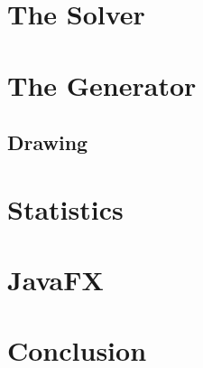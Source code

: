\documentclass[a4paper,10pt]{paper}
\begin{document}
\section{The Solver}



\section{The Generator}

\subsection{Drawing}

\section{Statistics}

\section{JavaFX}

\section{Conclusion}
\end{document}

